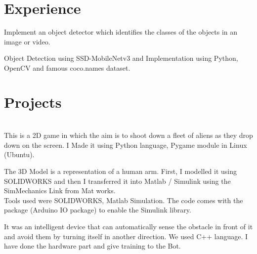 \documentclass[]{deedy-resume-openfont}
\begin{document}
\begin{minipage}[t]{0.66\textwidth} 


\section{Experience}
\sectionsep

\sectionsep

\vspace{\topsep} %
\begin{tightemize}
\item Implement an object detector which identifies the classes of the objects in an image or video.
\item Object Detection using SSD-MobileNetv3 and Implementation using Python, OpenCV and famous coco.names dataset. 
\end{tightemize}
\sectionsep



\section{Projects}
\\
This is a 2D game in which the aim is to shoot down a fleet of aliens as they drop down on the screen. I Made it using Python language, Pygame module in Linux (Ubuntu).  
\sectionsep

The 3D Model is a representation of a human arm. First, I modelled it using SOLIDWORKS and then I transferred it into Matlab / Simulink using the SimMechanics Link from Mat works.\\
Tools used were SOLIDWORKS, Matlab Simulation.
The code comes with the package (Arduino IO package) to enable the Simulink library. 
\sectionsep

It was an intelligent device that can automatically sense the obstacle in front of it and avoid them by turning itself in
another direction.
We used C++ language. I have done the hardware part and give training to the Bot.
\sectionsep


\end{minipage}
\end{document}

